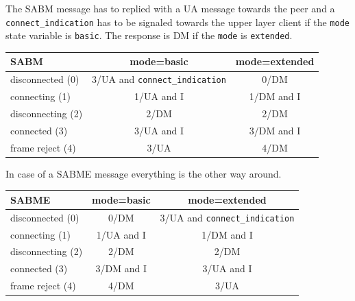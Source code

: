 \documentclass[a4paper]{article}
\begin{document}
The SABM message has to replied with a UA message towards the peer and a \verb!connect_indication! has to be signaled
towards the upper layer client if the \verb!mode! state variable is \verb/basic/. The
response is DM if the \verb!mode! is \verb/extended/.

{\footnotesize
\begin{center}
    \begin{tabular}{|l|c|c|}
        \hline
        SABM              & mode=basic                           & mode=extended  \\
        \hline
        disconnected (0)  & 3/UA and \verb!connect_indication! & 0/DM           \\
        \hline
        connecting (1)    & 1/UA and I                           & 1/DM and I     \\
        \hline
        disconnecting (2) & 2/DM                                 & 2/DM           \\
        \hline
        connected (3)     & 3/UA and I                           & 3/DM and I     \\
        \hline
        frame reject (4)  & 3/UA                                 & 4/DM           \\
        \hline
    \end{tabular}
\end{center}
}

In case of a SABME message everything is the other way around.

{\footnotesize
\begin{center}
    \begin{tabular}{|l|c|c|}
        \hline
        SABME             & mode=basic & mode=extended                         \\
        \hline
        disconnected (0)  & 0/DM       & 3/UA and \verb!connect_indication!  \\
        \hline
        connecting (1)    & 1/UA and I & 1/DM and I                            \\
        \hline
        disconnecting (2) & 2/DM       & 2/DM                                  \\
        \hline
        connected (3)     & 3/DM and I & 3/UA and I                            \\
        \hline
        frame reject (4)  & 4/DM       & 3/UA                                  \\
        \hline
    \end{tabular}
\end{center}
}
\end{document}
